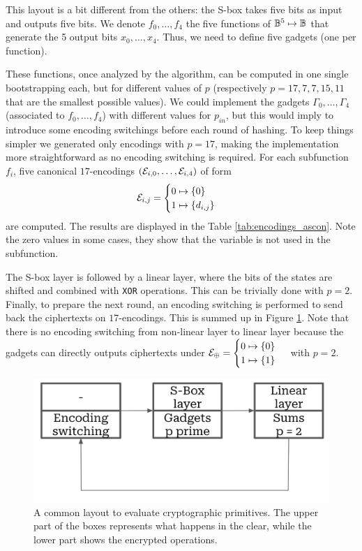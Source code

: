 This layout is a bit different from the others: the \gls{S-box} takes five bits as input and outputs five bits. We denote $f_0, \dots, f_4$ the five functions of $\mathbb{B}^5 \mapsto \mathbb{B}$ that generate the 5 output bits $x_0, \dots, x_4$. Thus, we need to define five gadgets (one per function).

These functions, once analyzed by the algorithm, can be computed in one single bootstrapping each, but for different values of $p$ (respectively $p=17, 7, 7, 15, 11$ that are the smallest possible values). We could implement the gadgets $\Gamma_0, \dots, \Gamma_4$ (associated to $f_0, \dots, f_4$) with different values for $p_{in}$, but this would imply to introduce some encoding switchings before each round of hashing. To keep things simpler we generated only encodings with $p = 17$, making the implementation more straightforward as no encoding switching is required. For each subfunction $f_i$, five canonical $17$-encodings $(\mathcal{E}_{i, 0}, \dots, \mathcal{E}_{i, 4})$ of form $$\mathcal{E}_{i, j} = \begin{cases} 0 \mapsto \{0\} \\ 1 \mapsto \{d_{i,j}\} \end{cases}$$ are computed. The results are displayed in the Table \ref{tab:encodings_ascon}. Note the zero values in some cases, they show that the variable is not used in the subfunction. 

The \gls{S-box} layer is followed by a linear layer, where the bits of the states are shifted and combined with \texttt{XOR} operations. This can be trivially done with $p=2$. Finally, to prepare the next round, an encoding switching is performed to send back the ciphertexts on $17$-encodings. This is summed up in Figure \ref{fig:layout_spn}. Note that there is no encoding switching from non-linear layer to linear layer because the gadgets can directly outputs ciphertexts under $\mathcal{E}_\oplus = \begin{cases} 0 \mapsto \{0\} \\ 1 \mapsto \{1\} \end{cases}$ with $p=2$.

\begin{figure}
    \centering
    \includegraphics[width=0.5\linewidth]{img/to_harmonize/layout_spn.png}
    \caption{A common layout to evaluate cryptographic primitives. The upper part of the boxes represents what happens in the clear, while the lower part shows the encrypted operations. }
    \label{fig:layout_spn}
\end{figure}


